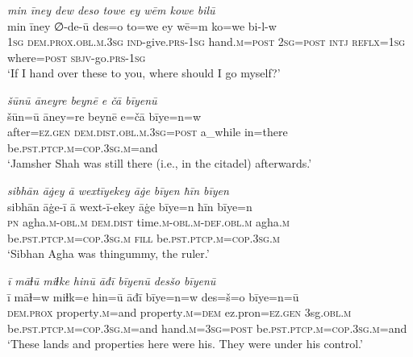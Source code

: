 \ea \label{DP.23}
\textit{min īney dew deso towe ey wēm kowe bilū} \\ 
\gll min īney ∅-de-ū des=o to=we ey wē=m ko=we bi-l-w \\ 
 \textsc{1sg} \textsc{dem.prox}\textsc{.obl}\textsc{.m}\textsc{.3sg} \textsc{ind-}give\textsc{.prs}\textsc{-1sg} hand\textsc{.m}\textsc{=\textsc{post}} \textsc{2sg}\textsc{=\textsc{post}} \textsc{intj} \textsc{reflx}\textsc{=1sg} where\textsc{=\textsc{post}} \textsc{sbjv-}go\textsc{.prs}\textsc{-1sg} \\ 
\glt `If I hand over these to you, where should I go myself?'
\z 
 
\ea \label{DP.25}
\textit{šūnū āneyre beynē e čā bīyenū} \\ 
\gll šūn=ū āney=re beynē e=čā bīye=n=w \\ 
 after\textsc{=ez}\textsc{.gen} \textsc{dem.dist}\textsc{.obl}\textsc{.m}\textsc{.3sg}\textsc{=\textsc{post}} a\_while in=there be\textsc{.pst}\textsc{.ptcp}\textsc{.m}\textsc{=cop}\textsc{.3sg}\textsc{.m}=and \\ 
\glt `Jamsher Shah was still there (i.e., in the citadel) afterwards.'
\z 
 
\ea \label{DP.26}
\textit{sibhān āġey ā wextīyekey āġe bīyen ħīn bīyen} \\ 
\gll sibhān āġe-ī ā wext-ī-ekey āġe bīye=n ħīn bīye=n \\ 
 \textsc{pn} agha\textsc{.m}\textsc{-obl}\textsc{.m} \textsc{dem.dist} time\textsc{.m}\textsc{-obl}\textsc{.m}\textsc{-def}\textsc{.obl}\textsc{.m} agha\textsc{.m} be\textsc{.pst}\textsc{.ptcp}\textsc{.m}\textsc{=cop}\textsc{.3sg}\textsc{.m} \textsc{fill} be\textsc{.pst}\textsc{.ptcp}\textsc{.m}\textsc{=cop}\textsc{.3sg}\textsc{.m} \\ 
\glt `Sibhan Agha was thingummy, the ruler.'
\z 
 
\ea \label{DP.28}
\textit{ī māɫū miɫke hinū āđī bīyenū desšo bīyenū} \\ 
\gll ī māɫ=w miɫk=e hin=ū āđī bīye=n=w des=š=o bīye=n=ū \\ 
 \textsc{dem.prox} property\textsc{.m}=and property\textsc{.m}\textsc{=dem} ez.pron\textsc{=ez}\textsc{.gen} 3sg\textsc{.obl}\textsc{.m} be\textsc{.pst}\textsc{.ptcp}\textsc{.m}\textsc{=cop}\textsc{.3sg}\textsc{.m}=and hand\textsc{.m}\textsc{=3sg}\textsc{=\textsc{post}} be\textsc{.pst}\textsc{.ptcp}\textsc{.m}\textsc{=cop}\textsc{.3sg}\textsc{.m}=and \\ 
\glt `These lands and properties here were his. They were under his control.'
\z 
 
